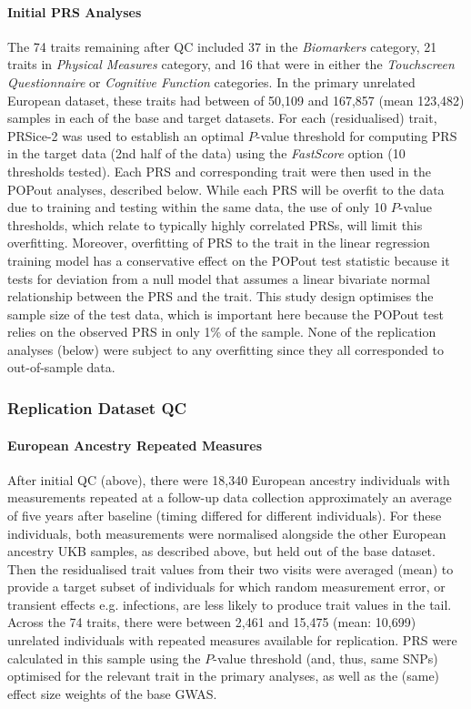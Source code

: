 \documentclass[12pt]{zHenriquesLab-StyleBioRxiv}
\begin{document}
{{\paragraph*{Initial PRS Analyses}
The 74 traits remaining after QC included 37 in the \textit{Biomarkers} category, 
21 traits in \textit{Physical Measures} category, and 16 that were in either 
the \textit{Touchscreen Questionnaire} or \textit{Cognitive Function} categories.  
In the primary unrelated European dataset, these traits had between of 50,109 and 167,857 
(mean 123,482) samples in each of the base and target datasets. For each (residualised) trait, 
PRSice-2 \cite{prsice} was used to establish an optimal $P$-value threshold for computing PRS in 
the target data (2nd half of the data) using the \textit{FastScore} option (10 thresholds tested). 
Each PRS and corresponding trait were then used in the POPout analyses, described below. 
While each PRS will be overfit to the data due to training and testing within the same data, 
the use of only 10 $P$-value thresholds, which relate to typically highly correlated PRSs, 
will limit this overfitting. Moreover, overfitting of PRS to the trait in the linear regression training 
model has a conservative effect on the POPout test statistic because it tests for deviation from a null 
model that assumes a linear bivariate normal relationship between the PRS and the trait. This study 
design optimises the sample size of the test data, which is important here because the POPout test 
relies on the observed PRS in only 1\% of the sample. None of the replication analyses (below) were subject to 
any overfitting since they all corresponded to out-of-sample data. 
%

\subsubsection*{Replication Dataset QC} \label{sec:methods:rqc} 
\paragraph*{European Ancestry Repeated Measures}
After initial QC (above), there were 18,340 European ancestry individuals 
with measurements repeated at a follow-up data collection approximately an average
of five years after baseline (timing differed for different individuals). For these individuals, both measurements were normalised alongside 
the other European ancestry UKB samples, as described above, but held out of the base dataset. Then 
the residualised trait values from their two visits were averaged (mean) to provide a 
target subset of individuals for which random measurement error, or transient 
effects e.g. infections, are less likely to produce trait values in the tail. 
Across the 74 traits, there were between 2,461 and 15,475 (mean: 10,699) unrelated 
individuals with repeated measures available for replication.  PRS were calculated in this sample 
using the $P$-value threshold (and, thus, same SNPs) optimised for the relevant 
trait in the primary analyses, as well as the (same) effect size weights of the base GWAS. 

}}
\end{document}
